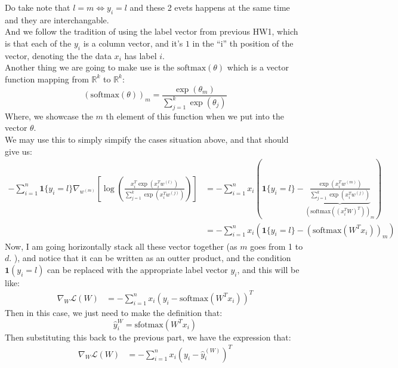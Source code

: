 \documentclass[]{article}
\begin{document}
        Do take note that $l = m \iff y_i = l$ and these 2 evets happens at the same time and they are interchangable.  
        \\
        And we follow the tradition of using the label vector from previous HW1, which is that each of the $y_i$ is a column vector, and it's $1$ in the ``i'' th position of the vector, denoting the the data $x_i$ has label $i$. 
        \\
        Another thing we are going to make use is the $\text{softmax}(\theta)$ which is a vector function mapping from $\mathbb{R}^k$ to $\mathbb{R}^k$: 
        $$
            \left(
                \text{softmax}(\theta)
            \right)_m
            = \frac{\exp(\theta_m)}{
                \sum_{j = 1}^{k}\exp(\theta_j)
            }
        $$
        Where, we showcase the $m$ th element of this function when we put into the vector $\theta$. 
        \\
        We may use this to simply simpify the cases situation above, and that should give us: 
        \begin{align*}\tag{B.4.4}\label{eqn:B.4.4}
            -\sum_{i = 1}^{n}
                \mathbf{1}\{y_i = l\}
                \nabla_{w^{(m)}} \left[
                    \log \left(
                    \frac{x_i^T\exp(x_i^T w^{(l)})}{
                        \sum_{j = 1}^{k}
                            \exp(x_i^T w^{(j)})
                    }
                    \right)
                \right] 
            &= 
            -\sum_{i = 1}^{n} 
            x_i \left(
                \mathbf{1}\{y_i = l\} - 
                \underbrace{\frac{
                        \exp(x_i^T w^{(m)})
                    }{
                            \sum_{j = 1}^{k}
                                \exp\left(
                                    x_i^T w^{(j)}
                                \right)
                   }}_{(\text{softmax}((x_i^TW)^T))_m}
                \right)
            \\
            &= 
            -\sum_{i = 1}^{n} 
            x_i \left(
                \mathbf{1}\{y_i = l\}
                - (\text{softmax}(W^Tx_i))_m
                \right)
        \end{align*}
        Now, I am going horizontally stack all these vector together (as $m$ goes from 1 to $d$. ), and notice that it can be written as an outter product, and the condition $\mathbf{1}(y_i = l)$ can be replaced with the appropriate label vector $y_i$, and this will be like: 
        \begin{align*}\tag{B.4.5}\label{eqn:B.4.5}
            \nabla_{W}\mathcal{L}(W) &=
            -\sum_{i = 1}^{n}
                x_i(y_i - \text{softmax}(W^Tx_i))^T
        \end{align*}
        Then in this case, we just need to make the definition that: 
        $$
            \hat{y}_i^{W} = \text{sfotmax}(W^Tx_i)
        $$
        Then substituting this back to the previous part, we have the expression that: 
        \begin{align*}\tag{B.4.6}\label{eqn:B.4.6}
            \nabla_{W}\mathcal{L}(W) &=
            -\sum_{i = 1}^{n}
                x_i(y_i - \hat{y}_i^{(W)})^T
        \end{align*}
\end{document}
